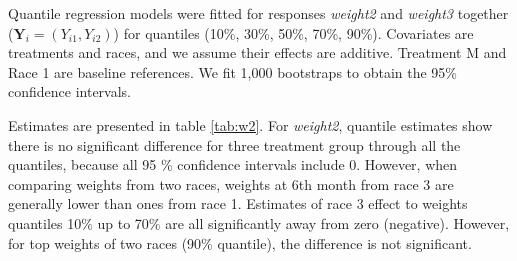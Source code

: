 \documentclass[12pt]{article}
\begin{document}
Quantile regression models were fitted for responses \textit{weight2}
and \textit{weight3} together ($\bm Y_i = (Y_{i1}, Y_{i2})$) for
quantiles (10\%, 30\%, 50\%, 70\%, 90\%). Covariates are treatments
and races, and we assume their effects are additive. Treatment M and
Race 1 are baseline references. We fit 1,000 bootstraps to obtain the
95\% confidence intervals.

Estimates are presented in table \ref{tab:w2}. For \textit{weight2},
quantile estimates show there is no significant difference for three
treatment group through all the quantiles, because all 95 \%
confidence intervals include 0. However, when comparing weights from
two races, weights at 6th month from race 3 are generally lower than
ones from race 1. Estimates of race 3 effect to weights quantiles 10\%
up to 70\% are all significantly away from zero (negative). However,
for top weights of two races (90\% quantile), the difference is not
significant.
\end{document}
